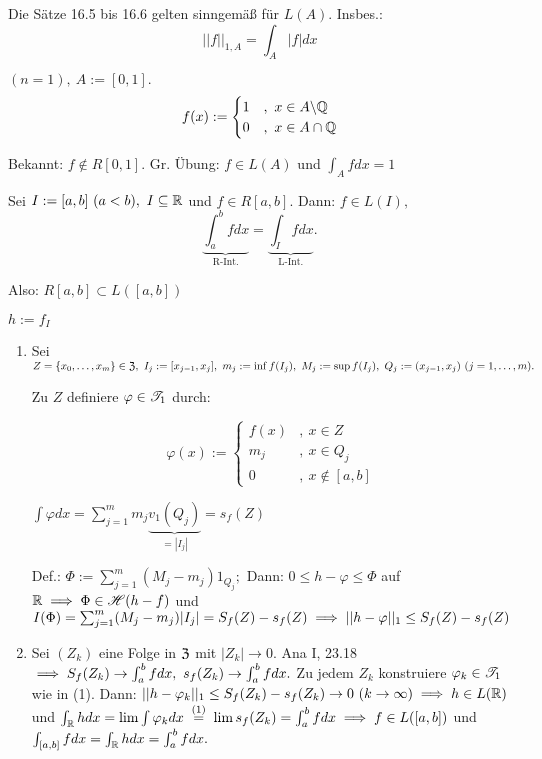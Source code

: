 \documentclass[a4paper,twoside,DIV15,BCOR12mm]{scrbook}
\begin{document}
\begin{satz}
Die Sätze 16.5 bis 16.6 gelten sinngemäß für $L(A)$. Insbes.: $$||f||_{1,A} = \int_A|f|dx$$
\end{satz}

\begin{beispiel}
$(n=1),\ A:=[0,1].$ $$f(x):=\begin{cases}
1 & ,\ x\in A\backslash\mathbb{Q} \\
0 & ,\ x\in A\cap\mathbb{Q}
\end{cases}$$

Bekannt: $f\notin R[0,1]$. Gr. Übung: $f\in L(A)$ und $\int_Afdx=1$
\end{beispiel}

\begin{satz}
Sei $I:=[a,b]\ (a<b),\ I\subseteq\MdR$ und $f\in R[a,b].$ Dann: $f\in L(I),$
$$\underbrace{\int_a^bfdx}_{\text{R-Int.}} = \underbrace{\int_I fdx}_{\text{L-Int.}}.$$

Also: $R[a,b] \subset L([a,b])$
\end{satz}

\begin{beweis}
$h:=f_I$

\begin{enumerate}
\item Sei $Z=\{x_0,\ldots,x_m\} \in \Z,\ I_j:=[x_{j-1},x_j],\ m_j:=\inf f(I_j),\ M_j:=\sup f(I_j),\ Q_j:=(x_{j-1},x_j)\ (j=1,\ldots,m).$

Zu $Z$ definiere $\varphi\in\mathscr{T}_1$ durch:

$$\varphi(x):=\begin{cases}
f(x) & ,\ x\in Z \\
m_j  & ,\ x\in Q_j \\
0    & ,\ x\notin [a,b]
\end{cases}$$

$\int\varphi dx = \sum_{j=1}^m m_j\underbrace{v_1(Q_j)}_{=|I_j|} = s_f(Z)$

Def.: $\Phi:=\sum_{j=1}^m (M_j-m_j) 1_{Q_j};$ Dann: $0\le h-\varphi\le\Phi$ auf $\mathbb{R} \implies \Phi\in\mathscr{H}(h-f)$ und $I(\Phi) = \sum_{j=1}^m (M_j-m_j)|I_j| = S_f(Z)-s_f(Z) \implies ||h-\varphi||_1 \le S_f(Z)-s_f(Z)$

\item Sei $(Z_k)$ eine Folge in $\mathfrak{Z}$ mit $|Z_k| \to 0$. Ana I, 23.18 $\implies S_f(Z_k) \to \int_a^bfdx,\ s_f(Z_k) \to \int_a^bfdx.$ Zu jedem $Z_k$ konstruiere $\varphi_k\in\mathscr{T}_1$ wie in (1). Dann: $||h-\varphi_k||_1 \le S_f(Z_k)-s_f(Z_k) \to 0\ (k\to\infty) \implies h\in L(\mathbb{R})$ und $\int_\MdR hdx = \lim\int\varphi_k dx \gleichnach{(1)} \lim s_f(Z_k) = \int_a^bfdx \folgt f\in L([a,b])$ und $\int_{[a,b]} fdx = \int_{\mathbb{R}} hdx = \int_a^bfdx.$
\end{enumerate}
\end{beweis}
\end{document}
